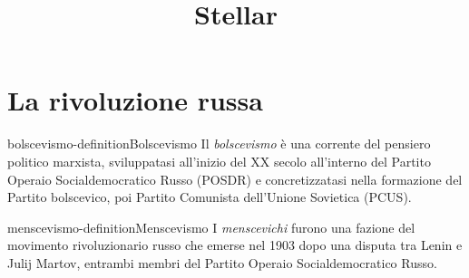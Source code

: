 \documentclass[preview]{standalone}
\begin{document}
\title{Stellar}
\genpage

\section{La rivoluzione russa}

\begin{snippetdefinition}{bolscevismo-definition}{Bolscevismo}
    Il \textit{bolscevismo} è una corrente del pensiero
    politico marxista, sviluppatasi all'inizio del XX secolo all'interno
    del Partito Operaio Socialdemocratico Russo (POSDR) e
    concretizzatasi nella formazione del Partito bolscevico,
    poi Partito Comunista dell'Unione Sovietica (PCUS).
\end{snippetdefinition}

\begin{snippetdefinition}{menscevismo-definition}{Menscevismo}
    I \textit{menscevichi} furono una fazione del movimento rivoluzionario
    russo che emerse nel 1903 dopo una disputa tra Lenin e Julij Martov,
    entrambi membri del Partito Operaio Socialdemocratico Russo.
\end{snippetdefinition}
\end{document}
